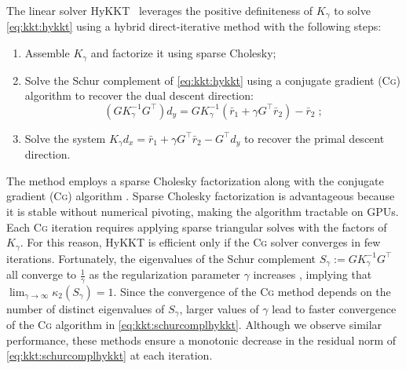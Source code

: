 \documentclass[smallextended]{svjour3}
\newcommand{\CG}{\textsc{Cg}\xspace}
\newcommand{\cond}{\kappa_2}
\begin{document}
The linear solver HyKKT~\cite{regev2023hykkt} leverages the positive definiteness of $K_\gamma$ to solve \eqref{eq:kkt:hykkt} using a hybrid direct-iterative method with the following steps:
\begin{enumerate}
  \item Assemble $K_\gamma$ and factorize it using sparse Cholesky;
  \item Solve the Schur complement of \eqref{eq:kkt:hykkt} using a conjugate gradient (\CG) algorithm to recover the dual descent direction:
    \begin{equation}
      \label{eq:kkt:schurcomplhykkt}
      (G K_\gamma^{-1} G^\top) d_y = G K_\gamma^{-1} (\bar{r}_1 + \gamma G^\top \bar{r}_2) - \bar{r}_2 \; ;
    \end{equation}
  \item Solve the system $K_\gamma d_x = \bar{r}_1 + \gamma G^\top \bar{r}_2 - G^\top d_y$ to recover the primal descent direction.
\end{enumerate}
The method employs a sparse Cholesky factorization along with the conjugate gradient (\CG) algorithm \cite{hestenes-stiefel-1952}.
Sparse Cholesky factorization is advantageous because it is stable without
numerical pivoting, making the algorithm tractable on GPUs.
Each \CG iteration requires applying sparse triangular solves with the factors of $K_\gamma$.
For this reason, HyKKT is efficient only if the \CG solver converges in few iterations.
Fortunately, the eigenvalues of the Schur complement $S_\gamma := G
K_\gamma^{-1} G^\top$ all converge to $\frac{1}{\gamma}$ as the
regularization parameter $\gamma$ increases \cite[Theorem 4]{regev2023hykkt},
implying that $\lim_{\gamma \to \infty} \cond(S_\gamma) = 1$.
Since the convergence of the \CG method depends on the number of distinct
eigenvalues of $S_{\gamma}$, larger values of $\gamma$ lead to faster convergence of the \CG algorithm in \eqref{eq:kkt:schurcomplhykkt}.
Although we observe similar performance, these methods ensure a monotonic decrease in the residual norm of \eqref{eq:kkt:schurcomplhykkt} at each iteration.
\end{document}
